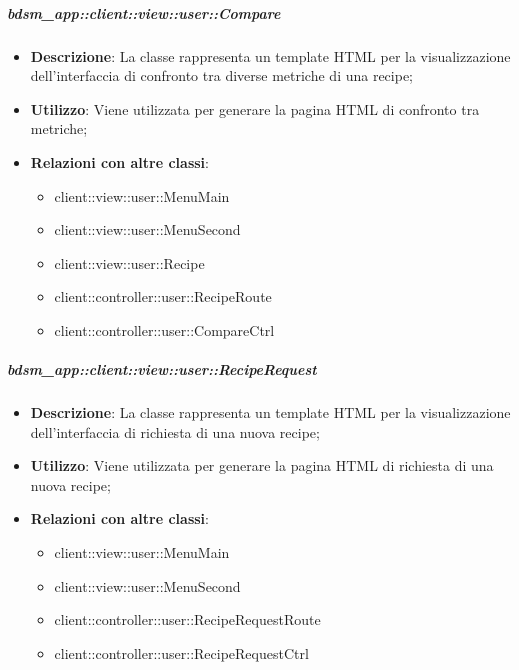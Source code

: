 		\subparagraph{bdsm\_app::client::view::user::Compare} %
		\label{subp:bdsm_app_client_view_user_compare}
			\begin{itemize}
				\item \textbf{Descrizione}: La classe rappresenta un template HTML per la visualizzazione dell'interfaccia di confronto tra diverse metriche di una recipe;
				\item \textbf{Utilizzo}: Viene utilizzata per generare la pagina HTML di confronto tra metriche;
				\item \textbf{Relazioni con altre classi}:
					\begin{itemize}
						\item client::view::user::MenuMain
						\item client::view::user::MenuSecond
						\item client::view::user::Recipe
						\item client::controller::user::RecipeRoute
						\item client::controller::user::CompareCtrl
					\end{itemize}
			\end{itemize}

		\subparagraph{bdsm\_app::client::view::user::RecipeRequest} %
		\label{subp:bdsm_app_client_view_user_reciperequest}
			\begin{itemize}
				\item \textbf{Descrizione}: La classe rappresenta un template HTML per la visualizzazione dell'interfaccia di richiesta di una nuova recipe;
				\item \textbf{Utilizzo}: Viene utilizzata per generare la pagina HTML di richiesta di una nuova recipe;
				\item \textbf{Relazioni con altre classi}:
					\begin{itemize}
						\item client::view::user::MenuMain
						\item client::view::user::MenuSecond
						\item client::controller::user::RecipeRequestRoute
						\item client::controller::user::RecipeRequestCtrl
					\end{itemize}
			\end{itemize}

